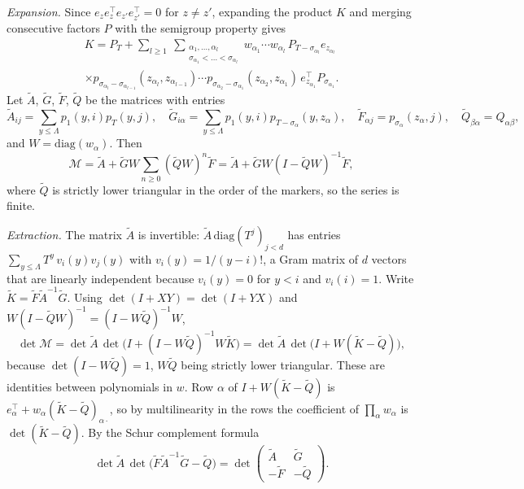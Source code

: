\documentclass[11pt]{amsart}
\theoremstyle{remark}
\numberwithin{equation}{section}
\begin{document}
\emph{Expansion.} Since $e_ze_z^{\top}e_{z'}e_{z'}^{\top}=0$ for $z\ne z'$, expanding the product $K$ and merging consecutive factors $P$ with the semigroup property gives
\begin{multline*}
K=P_T+\sum_{l\ge1}\ \sum_{\substack{\alpha_1,\dots,\alpha_l\\ \sigma_{\alpha_1}<\dots<\sigma_{\alpha_l}}}w_{\alpha_1}\cdots w_{\alpha_l}\,P_{T-\sigma_{\alpha_l}}e_{z_{\alpha_l}}\\
\times p_{\sigma_{\alpha_l}-\sigma_{\alpha_{l-1}}}(z_{\alpha_l},z_{\alpha_{l-1}})\cdots p_{\sigma_{\alpha_2}-\sigma_{\alpha_1}}(z_{\alpha_2},z_{\alpha_1})\,e_{z_{\alpha_1}}^{\top}P_{\sigma_{\alpha_1}}.
\end{multline*}
Let $\tilde A$, $\tilde G$, $\tilde F$, $\tilde Q$ be the matrices with entries
\[
\tilde A_{ij}=\sum_{y\le\Lambda}p_1(y,i)p_T(y,j),\quad \tilde G_{i\alpha}=\sum_{y\le\Lambda}p_1(y,i)p_{T-\sigma_\alpha}(y,z_\alpha),\quad \tilde F_{\alpha j}=p_{\sigma_\alpha}(z_\alpha,j),\quad \tilde Q_{\beta\alpha}=Q_{\alpha\beta},
\]
and $W=\mathrm{diag}(w_\alpha)$. Then
\[
\mathcal M=\tilde A+\tilde GW\sum_{n\ge0}(\tilde QW)^n\tilde F=\tilde A+\tilde GW(I-\tilde QW)^{-1}\tilde F,
\]
where $\tilde Q$ is strictly lower triangular in the order of the markers, so the series is finite.

\emph{Extraction.} The matrix $\tilde A$ is invertible: $\tilde A\,\mathrm{diag}(T^{j})_{j<d}$ has entries $\sum_{y\le\Lambda}T^y\,v_i(y)v_j(y)$ with $v_i(y)=1/(y-i)!$, a Gram matrix of $d$ vectors that are linearly independent because $v_i(y)=0$ for $y<i$ and $v_i(i)=1$. Write $\tilde K=\tilde F\tilde A^{-1}\tilde G$. Using $\det(I+XY)=\det(I+YX)$ and $W(I-\tilde QW)^{-1}=(I-W\tilde Q)^{-1}W$,
\[
\det\mathcal M=\det\tilde A\,\det\bigl(I+(I-W\tilde Q)^{-1}W\tilde K\bigr)=\det\tilde A\,\det\bigl(I+W(\tilde K-\tilde Q)\bigr),
\]
because $\det(I-W\tilde Q)=1$, $W\tilde Q$ being strictly lower triangular. These are identities between polynomials in $w$. Row $\alpha$ of $I+W(\tilde K-\tilde Q)$ is $e_\alpha^{\top}+w_\alpha(\tilde K-\tilde Q)_{\alpha\cdot}$, so by multilinearity in the rows the coefficient of $\prod_\alpha w_\alpha$ is $\det(\tilde K-\tilde Q)$. By the Schur complement formula
\[
\det\tilde A\,\det\bigl(\tilde F\tilde A^{-1}\tilde G-\tilde Q\bigr)=\det\begin{pmatrix}\tilde A&\tilde G\\-\tilde F&-\tilde Q\end{pmatrix}.
\]
\end{document}

